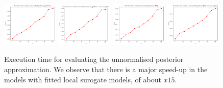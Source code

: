 \begin{figure}[h]
    \begin{center}
      \includegraphics[width=0.24\textwidth]{./Thesis/images/chapter4/exec_posterior_grad.png}
      \includegraphics[width=0.24\textwidth]{./Thesis/images/chapter4/exec_posterior_grad_fit.png}
      \includegraphics[width=0.24\textwidth]{./Thesis/images/chapter4/exec_posterior_bo.png}
      \includegraphics[width=0.24\textwidth]{./Thesis/images/chapter4/exec_posterior_bo_fit.png}
    \end{center}
    \caption{Execution time for evaluating the unnormalised posterior
      approximation. We observe that there is a major speed-up in the
      models with fitted local surogate models, of about $x15$.}
  \label{fig:exec_posterior}
\end{figure}


